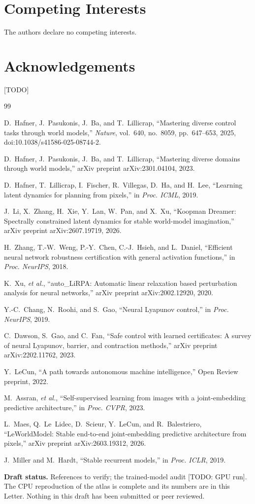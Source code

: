 \documentclass[11pt]{article}
\begin{document}
\section*{Competing Interests}
The authors declare no competing interests.

\section*{Acknowledgements}
[TODO]

\begin{thebibliography}{99}

D.~Hafner, J.~Pasukonis, J.~Ba, and T.~Lillicrap,
``Mastering diverse control tasks through world models,''
\emph{Nature}, vol.~640, no.~8059, pp.~647--653, 2025,
doi:10.1038/s41586-025-08744-2.

D.~Hafner, J.~Pasukonis, J.~Ba, and T.~Lillicrap,
``Mastering diverse domains through world models,''
arXiv preprint arXiv:2301.04104, 2023.

D.~Hafner, T.~Lillicrap, I.~Fischer, R.~Villegas, D.~Ha, and H.~Lee,
``Learning latent dynamics for planning from pixels,''
in \emph{Proc. ICML}, 2019.

J.~Li, X.~Zhang, H.~Xie, Y.~Lan, W.~Pan, and X.~Xu,
``Koopman Dreamer: Spectrally constrained latent dynamics for stable
world-model imagination,''
arXiv preprint arXiv:2607.19719, 2026.

H.~Zhang, T.-W.~Weng, P.-Y.~Chen, C.-J.~Hsieh, and L.~Daniel,
``Efficient neural network robustness certification with general activation
functions,''
in \emph{Proc. NeurIPS}, 2018.

K.~Xu, \emph{et al.},
``auto\_LiRPA: Automatic linear relaxation based perturbation analysis for
neural networks,''
arXiv preprint arXiv:2002.12920, 2020.

Y.-C.~Chang, N.~Roohi, and S.~Gao,
``Neural Lyapunov control,''
in \emph{Proc. NeurIPS}, 2019.

C.~Dawson, S.~Gao, and C.~Fan,
``Safe control with learned certificates: A survey of neural Lyapunov,
barrier, and contraction methods,''
arXiv preprint arXiv:2202.11762, 2023.

Y.~LeCun,
``A path towards autonomous machine intelligence,''
Open Review preprint, 2022.

M.~Assran, \emph{et al.},
``Self-supervised learning from images with a joint-embedding predictive
architecture,''
in \emph{Proc. CVPR}, 2023.

L.~Maes, Q.~Le~Lidec, D.~Scieur, Y.~LeCun, and R.~Balestriero,
``LeWorldModel: Stable end-to-end joint-embedding predictive architecture
from pixels,''
arXiv preprint arXiv:2603.19312, 2026.

J.~Miller and M.~Hardt,
``Stable recurrent models,''
in \emph{Proc. ICLR}, 2019.

\end{thebibliography}

\vspace{1em}
\noindent\textbf{Draft status.} References to verify; the trained-model
audit [TODO: GPU run]. The CPU reproduction of the atlas is complete and its
numbers are in this Letter. Nothing in this draft has been submitted or peer
reviewed.
\end{document}
